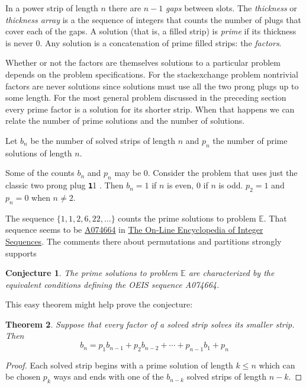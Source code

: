 \documentclass[10pt]{article}
\newtheorem{theorem}{Theorem}
\newtheorem{conjecture}[theorem]{Conjecture}
\numberwithin{equation}{section}
\newcommand{\plug}[1]{%
\mbox{{\textbf\texttt #1}}
}
\begin{document}
In a  power strip of length $n$ there are $n-1$ \emph{gaps} between
slots. The \emph{thickness} or \emph{thickness array} is a the
sequence of integers that counts the number of plugs that cover each
of the gaps. A solution (that is, a filled strip) is \emph{prime} if
its thickness is never $0$. Any solution is a concatenation of prime
filled strips: the \emph{factors}.

Whether or not the factors are themselves solutions to a
particular problem depends on the problem specifications. For the
stackexchange problem nontrivial factors are never solutions since
solutions must use all the two prong plugs up to some length. For the
most general problem discussed in the preceding section every prime
factor is a solution for its shorter strip. When that  happens we can
relate the number of prime solutions and the number of solutions.

Let $b_n$ be the number of solved strips of length $n$ and
$p_n$ the number of prime solutions of length $n$.

Some of the counts $b_n$ and $p_n$ may be $0$. Consider the
problem that uses just the classic two prong plug \plug{11}.
Then $b_n = 1$ if $n$ is even, $0$ if $n$ is odd. $p_2 =1$ and
$p_n = 0$ when $n \ne 2$.

The sequence $\{1,1,2,6,22, \ldots\}$ counts the prime solutions to
problem $\mathbb{E}$. That sequence seems to be
\href{https://oeis.org/A074664}{A074664} in
\href{https://oeis.org}{The On-Line Encyclopedia of Integer
  Sequences}. The comments there about permutations and partitions
strongly supports

\begin{conjecture}
The prime solutions to problem $\mathbb{E}$ are characterized by the
equivalent conditions defining the OEIS sequence A074664.
\end{conjecture}

This easy theorem might help prove the conjecture:

\begin{theorem}
Suppose that every factor of a solved strip solves its smaller strip.
 Then
$$
b_n = p_1 b_{n-1} + p_2b_{n-2} + \cdots + p_{n-1}b_1 + p_n
$$
\end{theorem}
\begin{proof}
Each solved strip begins with a prime solution of length $k \le n$ which can be
chosen $p_k$ ways and ends with one of the $b_{n-k}$ solved strips of
length $n-k$. 
\end{proof}
\end{document}
